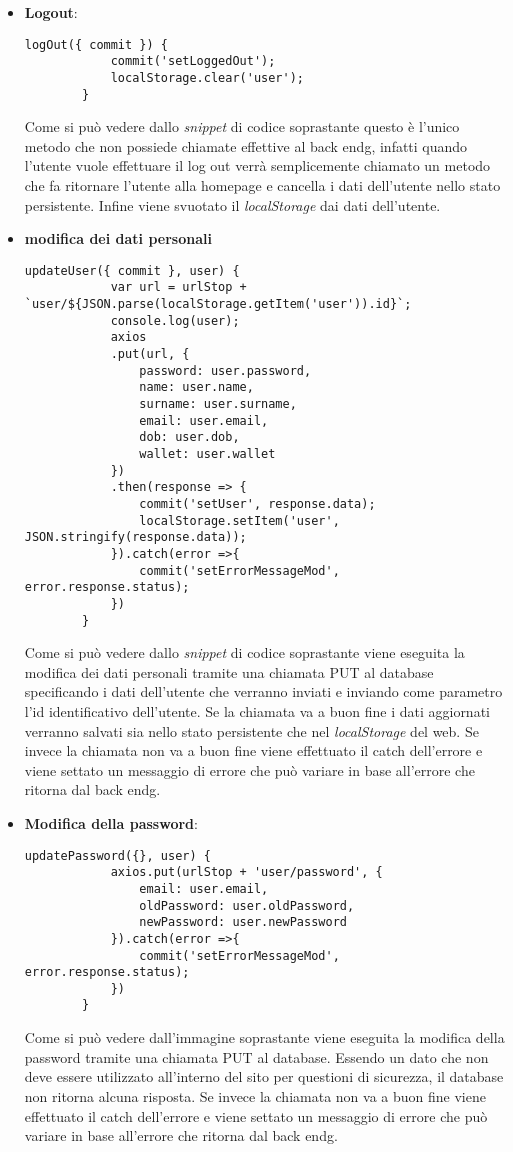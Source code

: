 \begin{itemize}
	\item \textbf{Logout}:
	\begin{lstlisting}[caption=Logout., label=lst::logout]
		logOut({ commit }) {
			commit('setLoggedOut');
			localStorage.clear('user');
		}
	\end{lstlisting}
	Come si può vedere dallo \textit{snippet} di codice soprastante questo è l'unico metodo che non possiede chiamate effettive al \gls{back endg}, infatti quando l'utente vuole effettuare il log out verrà semplicemente chiamato un metodo che fa ritornare l'utente alla homepage e cancella i dati dell'utente nello stato persistente. Infine viene svuotato il \textit{localStorage} dai dati dell'utente.
	\item \textbf{modifica dei dati personali}
	\begin{lstlisting}[caption=Modifica dei dati personali., label=lst::modDati]
		updateUser({ commit }, user) {
			var url = urlStop + `user/${JSON.parse(localStorage.getItem('user')).id}`;
			console.log(user);
			axios
			.put(url, {
				password: user.password,
				name: user.name,
				surname: user.surname,
				email: user.email,
				dob: user.dob,
				wallet: user.wallet
			})
			.then(response => {
				commit('setUser', response.data);
				localStorage.setItem('user', JSON.stringify(response.data));
			}).catch(error =>{
				commit('setErrorMessageMod', error.response.status);
			})
		}
	\end{lstlisting}
	Come si può vedere dallo \textit{snippet} di codice soprastante viene eseguita la modifica dei dati personali tramite una chiamata PUT al database specificando i dati dell'utente che verranno inviati e inviando come parametro l'id identificativo dell'utente. Se la chiamata va a buon fine i dati aggiornati verranno salvati sia nello stato persistente che nel \textit{localStorage} del web. Se invece  la chiamata non va a buon fine viene effettuato il catch dell'errore e viene settato un messaggio di errore che può variare in base all'errore che ritorna dal \gls{back endg}.
	\item \textbf{Modifica della password}:
	\begin{lstlisting}[caption=Modifica della password., label=lst::modPassword]
		updatePassword({}, user) {
			axios.put(urlStop + 'user/password', {
				email: user.email,
				oldPassword: user.oldPassword,
				newPassword: user.newPassword
			}).catch(error =>{
				commit('setErrorMessageMod', error.response.status);
			})
		}
	\end{lstlisting}
	Come si può vedere dall'immagine soprastante viene eseguita la modifica della password tramite una chiamata PUT al database. Essendo un dato che non deve essere utilizzato all'interno del sito per questioni di sicurezza, il database non ritorna alcuna risposta. Se invece  la chiamata non va a buon fine viene effettuato il catch dell'errore e viene settato un messaggio di errore che può variare in base all'errore che ritorna dal \gls{back endg}.
\end{itemize}

